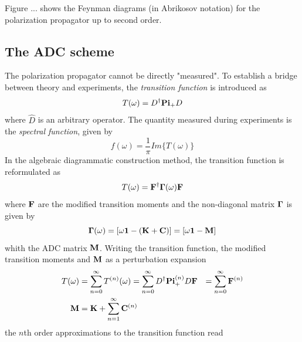 Figure ... shows the Feynman diagrams (in Abrikosov notation) for the polarization propagator up to second order. 

\subsection{The ADC scheme}

The polarization propagator cannot be directly "measured". To establish a bridge between theory and experiments, the \emph{transition function} is introduced as
\begin{equation}
T(\omega) = D^{\dagger} \mathbf{Pi}_{+} D 
\end{equation}
\noindent where $\hat{D}$ is an arbitrary operator. The quantity measured during experiments is the \emph{spectral function}, given by
\begin{equation}
f(\omega) = \frac{1}{\pi}Im\{T(\omega)\}
\end{equation}
In the algebraic diagrammatic construction method, the transition function is reformulated as
\begin{equation}
T(\omega) = \mathbf{F}^{\dagger} \mathbf{\Gamma}(\omega) \mathbf{F}
\end{equation}
\noindent where $\mathbf{F}$ are the modified transition moments and the non-diagonal matrix $\mathbf{\Gamma}$ is given by
\begin{equation}
\mathbf{\Gamma}(\omega) = \left[ \omega \mathbf{1} - (\mathbf{K} + \mathbf{C}) \right] = \left[ \omega \mathbf{1} - \mathbf{M} \right]
\end{equation}
\noindent whith the ADC matrix $\mathbf{M}$. Writing the transition function, the modified transition moments and $\mathbf{M}$ as a perturbation expansion
\begin{align}
T(\omega) &= \sum_{n=0}^{\infty} T^{(n)}(\omega) = \sum_{n=0}^{\infty} D^{\dagger} \mathbf{Pi}_{+}^{(n)} D
\mathbf{F} &= \sum_{n=0}^{\infty} \mathbf{F}^{(n)} \\
\mathbf{M} &= \mathbf{K} + \sum_{n=1}^{\infty} \mathbf{C}^{(n)}
\end{align} 
\noindent the $n$th order approximations to the transition function read
